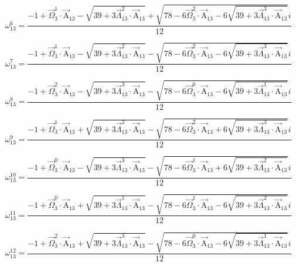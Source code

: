 \documentclass{article}
\begin{document}
\[ \omega_{13}^{6}=\frac{-1+\vec{\Omega}_{3}^{1}\cdot\vec{\mathrm{A}}_{13}-\sqrt{39+3\vec{\Lambda}_{13}^{2}\cdot\vec{\mathrm{A}}_{13}}+\sqrt{78-6\vec{\Omega}_{3}^{2}\cdot\vec{\mathrm{A}}_{13}-6\sqrt{39+3\vec{\Lambda}_{13}^{3}\cdot\vec{\mathrm{A}}_{13}}}i}{12} \]

\[ \omega_{13}^{7}=\frac{-1+\vec{\Omega}_{3}^{1}\cdot\vec{\mathrm{A}}_{13}-\sqrt{39+3\vec{\Lambda}_{13}^{2}\cdot\vec{\mathrm{A}}_{13}}-\sqrt{78-6\vec{\Omega}_{3}^{2}\cdot\vec{\mathrm{A}}_{13}-6\sqrt{39+3\vec{\Lambda}_{13}^{3}\cdot\vec{\mathrm{A}}_{13}}}i}{12} \]

\[ \omega_{13}^{8}=\frac{-1+\vec{\Omega}_{3}^{2}\cdot\vec{\mathrm{A}}_{13}-\sqrt{39+3\vec{\Lambda}_{13}^{3}\cdot\vec{\mathrm{A}}_{13}}-\sqrt{78-6\vec{\Omega}_{3}^{0}\cdot\vec{\mathrm{A}}_{13}-6\sqrt{39+3\vec{\Lambda}_{13}^{1}\cdot\vec{\mathrm{A}}_{13}}}i}{12} \]

\[ \omega_{13}^{9}=\frac{-1+\vec{\Omega}_{3}^{1}\cdot\vec{\mathrm{A}}_{13}+\sqrt{39+3\vec{\Lambda}_{13}^{2}\cdot\vec{\mathrm{A}}_{13}}-\sqrt{78-6\vec{\Omega}_{3}^{2}\cdot\vec{\mathrm{A}}_{13}+6\sqrt{39+3\vec{\Lambda}_{13}^{3}\cdot\vec{\mathrm{A}}_{13}}}i}{12} \]

\[ \omega_{13}^{10}=\frac{-1+\vec{\Omega}_{3}^{0}\cdot\vec{\mathrm{A}}_{13}-\sqrt{39+3\vec{\Lambda}_{13}^{3}\cdot\vec{\mathrm{A}}_{13}}-\sqrt{78-6\vec{\Omega}_{3}^{1}\cdot\vec{\mathrm{A}}_{13}+6\sqrt{39+3\vec{\Lambda}_{13}^{2}\cdot\vec{\mathrm{A}}_{13}}}i}{12} \]

\[ \omega_{13}^{11}=\frac{-1+\vec{\Omega}_{3}^{0}\cdot\vec{\mathrm{A}}_{13}+\sqrt{39+3\vec{\Lambda}_{13}^{1}\cdot\vec{\mathrm{A}}_{13}}-\sqrt{78-6\vec{\Omega}_{3}^{1}\cdot\vec{\mathrm{A}}_{13}-6\sqrt{39+3\vec{\Lambda}_{13}^{2}\cdot\vec{\mathrm{A}}_{13}}}i}{12} \]

\[ \omega_{13}^{12}=\frac{-1+\vec{\Omega}_{3}^{2}\cdot\vec{\mathrm{A}}_{13}+\sqrt{39+3\vec{\Lambda}_{13}^{3}\cdot\vec{\mathrm{A}}_{13}}-\sqrt{78-6\vec{\Omega}_{3}^{0}\cdot\vec{\mathrm{A}}_{13}-6\sqrt{39+3\vec{\Lambda}_{13}^{1}\cdot\vec{\mathrm{A}}_{13}}}i}{12} \]
\end{document}
